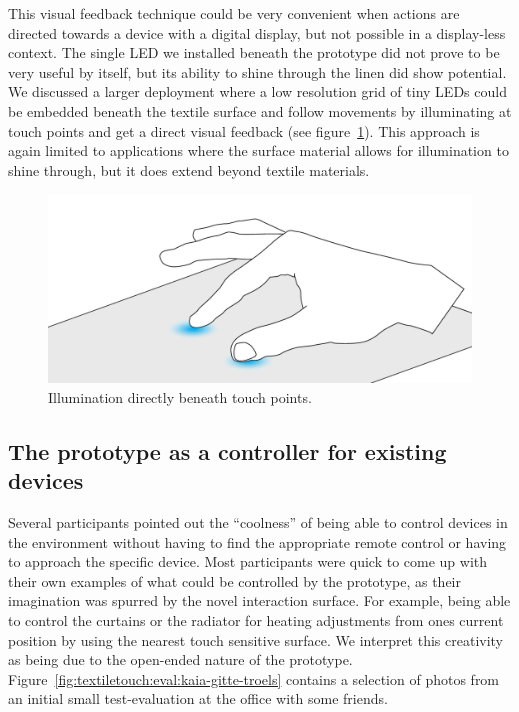 This visual feedback technique could be very convenient when actions are directed towards a device with a digital display, but not possible in a display-less context.
The single LED we installed beneath the prototype did not prove to be very useful by itself, but its ability to shine through the linen did show potential.
We discussed a larger deployment where a low resolution grid of tiny LEDs could be embedded beneath the textile surface and follow movements by illuminating at touch points and get a direct visual feedback (see figure~\ref{fig:textiletouch:eval:backlighting}).
This approach is again limited to applications where the surface material allows for illumination to shine through, but it does extend beyond textile materials.

\begin{figure}[h]
  \centering
  \begin{minipage}[b]{.8\textwidth}
    \centering
    \includegraphics[width=.7\linewidth]{figures/touch/evaluation/backlid_textile}
  \caption[Illumination directly beneath touch points.]
  {Illumination directly beneath touch points.}
  \label{fig:textiletouch:eval:backlighting}
  \end{minipage}
\end{figure}

\subsection{The prototype as a controller for existing devices}

Several participants pointed out the ``coolness'' of being able to control devices in the environment without having to find the appropriate remote control or having to approach the specific device.
Most participants were quick to come up with their own examples of what could be controlled by the prototype, as their imagination was spurred by the novel interaction surface.
For example, being able to control the curtains or the radiator for heating adjustments from ones current position by using the nearest touch sensitive surface.
We interpret this creativity as being due to the open-ended nature of the prototype.
Figure~\ref{fig:textiletouch:eval:kaia-gitte-troels} contains a selection of photos from an initial small test-evaluation at the office with some friends.

